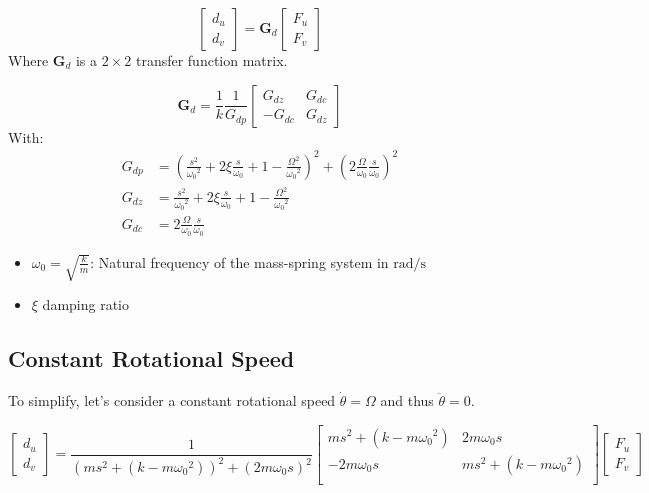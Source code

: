 \documentclass{ISMA_USD2020}
\begin{document}
\begin{equation}
\begin{bmatrix} d_u \\ d_v \end{bmatrix} =
\bm{G}_d
\begin{bmatrix} F_u \\ F_v \end{bmatrix}
\end{equation}
Where \(\bm{G}_d\) is a \(2 \times 2\) transfer function matrix.

\begin{equation}
\bm{G}_d = \frac{1}{k} \frac{1}{G_{dp}}
\begin{bmatrix}
   G_{dz} & G_{dc} \\
  -G_{dc} & G_{dz}
\end{bmatrix}
\end{equation}
With:
\begin{subequations}
  \begin{align}
    G_{dp} &= \left( \frac{s^2}{{\omega_0}^2} + 2 \xi \frac{s}{\omega_0} + 1 - \frac{{\Omega}^2}{{\omega_0}^2} \right)^2 + \left( 2 \frac{\Omega}{\omega_0} \frac{s}{\omega_0} \right)^2 \\
    G_{dz} &= \frac{s^2}{{\omega_0}^2} + 2 \xi \frac{s}{\omega_0} + 1 - \frac{{\Omega}^2}{{\omega_0}^2} \\
    G_{dc} &= 2 \frac{\Omega}{\omega_0} \frac{s}{\omega_0}
  \end{align}
\end{subequations}

\begin{itemize}
\item \(\omega_0 = \sqrt{\frac{k}{m}}\): Natural frequency of the mass-spring system in \(\si{\radian/\s}\)
\item \(\xi\) damping ratio
\end{itemize}


\subsection{Constant Rotational Speed}
\label{sec:orgd9375df}
To simplify, let's consider a constant rotational speed \(\dot{\theta} = \Omega\) and thus \(\ddot{\theta} = 0\).

\begin{equation}
\label{eq:coupledplant}
\begin{bmatrix} d_u \\ d_v \end{bmatrix} =
\frac{1}{(m s^2 + (k - m{\omega_0}^2))^2 + (2 m {\omega_0} s)^2}
\begin{bmatrix}
  ms^2 + (k-m{\omega_0}^2) & 2 m \omega_0 s \\
  -2 m \omega_0 s          & ms^2 + (k-m{\omega_0}^2) \\
\end{bmatrix}
\begin{bmatrix} F_u \\ F_v \end{bmatrix}
\end{equation}
\end{document}
